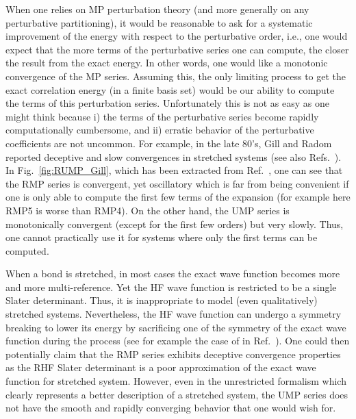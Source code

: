 \documentclass[11pt,a4paper]{article}
\begin{document}
When one relies on MP perturbation theory (and more generally on any perturbative partitioning), it would be reasonable to ask for a systematic improvement of the energy with respect to the perturbative order, i.e., one would expect that the more terms of the perturbative series one can compute, the closer the result from the exact energy.
In other words, one would like a monotonic convergence of the MP series. Assuming this, the only limiting process to get the exact correlation energy (in a finite basis set) would be our ability to compute the terms of this perturbation series.
Unfortunately this is not as easy as one might think because i) the terms of the perturbative series become rapidly computationally cumbersome, and ii) erratic behavior of the perturbative coefficients are not uncommon. For example, in the late 80's, Gill and Radom reported deceptive and slow convergences in stretched systems \cite{Gill_1986, Gill_1988} (see also Refs.~\cite{Handy_1985, Lepetit_1988}). 
In Fig.~\ref{fig:RUMP_Gill}, which has been extracted from Ref.~\cite{Gill_1986}, one can see that the RMP series is convergent, yet oscillatory which is far from being convenient if one is only able to compute the first few terms of the expansion (for example here RMP5 is worse than RMP4). 
On the other hand, the UMP series is monotonically convergent (except for the first few orders) but very slowly. 
Thus, one cannot practically use it for systems where only the first terms can be computed.

When a bond is stretched, in most cases the exact wave function becomes more and more multi-reference. Yet the HF wave function is restricted to be a single Slater determinant.
Thus, it is inappropriate to model (even qualitatively) stretched systems. Nevertheless, the HF wave function can undergo a symmetry breaking to lower its energy by sacrificing one of the symmetry of the exact wave function during the process (see for example the case of  in Ref.~\cite{SzaboBook}). 
One could then potentially claim that the RMP series exhibits deceptive convergence properties as the RHF Slater determinant is a poor approximation of the exact wave function for stretched system. However, even in the unrestricted formalism which clearly represents a better description of a stretched system, the UMP series does not have the smooth and rapidly converging behavior that one would wish for. 
\end{document}
